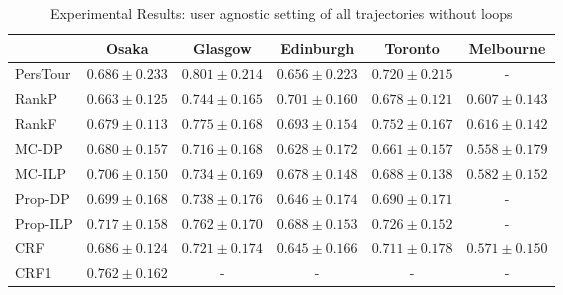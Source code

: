
\begin{table*}
\centering
\caption{Experimental Results: user agnostic setting of all trajectories without loops}
\begin{tabular}{l|ccccc} \hline
 & Osaka & Glasgow & Edinburgh & Toronto & Melbourne \\ \hline
PersTour & $0.686\pm0.233$ & $\mathbf{0.801\pm0.214}$ & $0.656\pm0.223$ & $0.720\pm0.215$ & - \\
RankP & $0.663\pm0.125$ & $0.744\pm0.165$ & $\mathbf{0.701\pm0.160}$ & $0.678\pm0.121$ & $0.607\pm0.143$ \\
RankF & $0.679\pm0.113$ & $0.775\pm0.168$ & $0.693\pm0.154$ & $0.752\pm0.167$ & $0.616\pm0.142$ \\
MC-DP & $0.680\pm0.157$ & $0.716\pm0.168$ & $0.628\pm0.172$ & $0.661\pm0.157$ & $0.558\pm0.179$ \\
MC-ILP & $0.706\pm0.150$ & $0.734\pm0.169$ & $0.678\pm0.148$ & $0.688\pm0.138$ & $0.582\pm0.152$ \\
Prop-DP & $0.699\pm0.168$ & $0.738\pm0.176$ & $0.646\pm0.174$ & $0.690\pm0.171$ & - \\
Prop-ILP & $0.717\pm0.158$ & $0.762\pm0.170$ & $0.688\pm0.153$ & $\mathbf{0.726\pm0.152}$ & - \\
CRF & $0.686\pm0.124$ & $0.721\pm0.174$ & $0.645\pm0.166$ & $0.711\pm0.178$ & $0.571\pm0.150$ \\
CRF1 & $\mathbf{0.762\pm0.162}$ & - & - & - & - \\
\hline
\end{tabular}
\end{table*}

